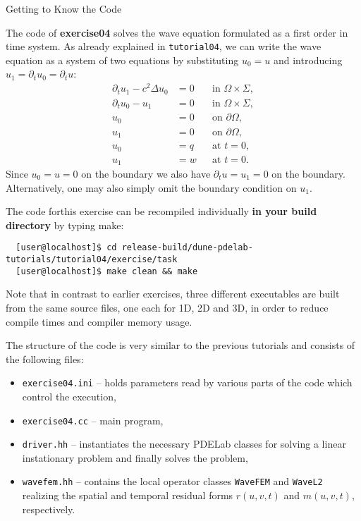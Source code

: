 \documentclass[12pt,a4paper]{article}
\begin{document}
\begin{Exercise}{Getting to Know the Code}

  \lstset{language=bash}

  The code of \textbf{exercise04} solves the wave equation formulated as a first order in time system. As already explained in \lstinline{tutorial04}, we can write the wave equation as a system of two equations by substituting $u_0=u$ and introducing $u_1=\partial_t u_0 =\partial_t u$:
\begin{subequations}
\label{eq:SystemForm1}
\begin{align}
\partial_t u_1 - c^2\Delta u_0 &=0 &&\text{in $\Omega\times\Sigma$}, \label{eq:2a}\\
\partial_t u_0 - u_1 &=0 &&\text{in $\Omega\times\Sigma$}, \label{eq:2b}\\
u_0 &= 0 &&\text{on $\partial\Omega$},\\
u_1 &= 0 &&\text{on $\partial\Omega$},\\
u_0 &= q &&\text{at $t=0$},\\
u_1 &= w &&\text{at $t=0$}.
\end{align}
\end{subequations}
Since $u_0=u=0$ on the boundary we also have $\partial_t u = u_1 = 0$ on the boundary.
Alternatively, one may also simply omit the boundary condition on $u_1$.


  The code forthis exercise can be recompiled individually \textbf{in
    your build directory} by typing make:
  \begin{lstlisting}
  [user@localhost]$ cd release-build/dune-pdelab-tutorials/tutorial04/exercise/task
  [user@localhost]$ make clean && make
  \end{lstlisting}

  Note that in contrast to earlier exercises, three different executables are built from the same source files,
  one each for 1D, 2D and 3D, in order to reduce compile times and compiler memory usage.

  The structure of the code is very similar to the previous tutorials and
  consists of the following files:
  \begin{itemize}
  \item \lstinline!exercise04.ini! -- holds parameters read by various parts of the code which control the execution,
  \item \lstinline!exercise04.cc! -- main program,
  \item \lstinline!driver.hh! -- instantiates the necessary PDELab classes for solving a linear instationary problem and finally solves the problem,
  \item \lstinline!wavefem.hh! -- contains the local operator classes \lstinline!WaveFEM! and \lstinline!WaveL2! realizing the spatial and temporal residual forms $r(u,v,t)$ and $m(u,v,t)$, respectively.
  \end{itemize}


\end{Exercise}
\end{document}
